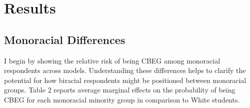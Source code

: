 \documentclass[
  12pt,
  letterpaper,
]{article}
\begin{document}
\hypertarget{results}{%
\section{Results}\label{results}}

\hypertarget{monoracial-differences}{%
\subsection{Monoracial Differences}\label{monoracial-differences}}

I begin by showing the relative risk of being CBEG among monoracial
respondents across models. Understanding these differences helps to
clarify the potential for how biracial respondents might be positioned
between monoracial groups. Table 2 reports average marginal effects on
the probability of being CBEG for each monoracial minority group in
comparison to White students.
\end{document}
